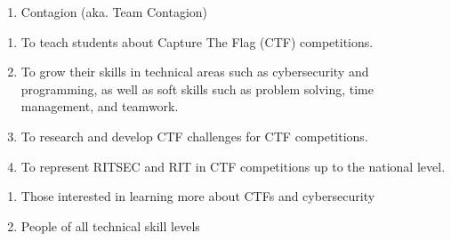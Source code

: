

\begin{enumerate}
	\item Contagion (aka. Team Contagion)
\end{enumerate}


\begin{enumerate}
	\item To teach students about Capture The Flag (CTF) competitions.
	\item To grow their skills in technical areas such as cybersecurity and programming,
	      as well as soft skills such as problem solving, time management, and teamwork.
	\item To research and develop CTF challenges for CTF competitions.
	\item To represent RITSEC and RIT in CTF competitions up to the national level.
\end{enumerate}


\begin{enumerate}
	\item Those interested in learning more about CTFs and cybersecurity
	\item People of all technical skill levels
\end{enumerate}